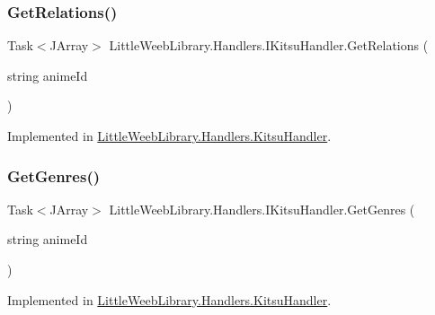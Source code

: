 \mbox{\label{interface_little_weeb_library_1_1_handlers_1_1_i_kitsu_handler_aa82bf536086211de6b458610b83ed43f}} 
\subsubsection{\texorpdfstring{Get\+Relations()}{GetRelations()}}
{\footnotesize\ttfamily Task$<$J\+Array$>$ Little\+Weeb\+Library.\+Handlers.\+I\+Kitsu\+Handler.\+Get\+Relations (\begin{DoxyParamCaption}\item[{string}]{anime\+Id }\end{DoxyParamCaption})}



Implemented in \mbox{\hyperlink{class_little_weeb_library_1_1_handlers_1_1_kitsu_handler_ad1ba51037e72c80804018f4c1df37581}{Little\+Weeb\+Library.\+Handlers.\+Kitsu\+Handler}}.

\mbox{\label{interface_little_weeb_library_1_1_handlers_1_1_i_kitsu_handler_a22e208a4c0ea64dafdbeb1a133739bfd}} 
\subsubsection{\texorpdfstring{Get\+Genres()}{GetGenres()}}
{\footnotesize\ttfamily Task$<$J\+Array$>$ Little\+Weeb\+Library.\+Handlers.\+I\+Kitsu\+Handler.\+Get\+Genres (\begin{DoxyParamCaption}\item[{string}]{anime\+Id }\end{DoxyParamCaption})}



Implemented in \mbox{\hyperlink{class_little_weeb_library_1_1_handlers_1_1_kitsu_handler_aabd039f9220f03f5c9dcf83e104531b1}{Little\+Weeb\+Library.\+Handlers.\+Kitsu\+Handler}}.

